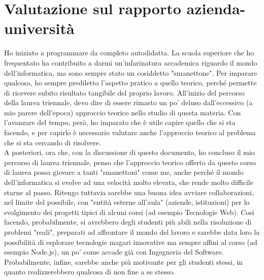 \section{Valutazione sul rapporto azienda-università}
Ho iniziato a programmare da completo autodidatta. La scuola superiore che ho frequentato ha contribuito a darmi un'infarinatura accademica riguardo il mondo dell'informatica, ma sono sempre stato un cosiddetto "smanettone". Per imparare qualcosa, ho sempre prediletto l'aspetto pratico a quello teorico, perché permette di ricevere subito risultato tangibile del proprio lavoro. All'inizio del percorso della laurea triennale, devo dire di essere rimasto un po' deluso dall'eccessivo (a mio parere dell'epoca) approccio teorico nello studio di questa materia. Con l'avanzare del tempo, però, ho imparato che è utile capire quello che si sta facendo, e per capirlo è necessario valutare anche l'approccio teorico al problema che si sta cercando di risolvere.\\
A posteriori, ora che, con la discussione di questo documento, ho concluso il mio percorso di laurea triennale, penso che l'approccio teorico offerto da questo corso di laurea possa giovare a tanti "smanettoni" come me, anche perché il mondo dell'informatica si evolve ad una velocità molto elevata, che rende molto difficile starne al passo. Ritengo tuttavia sarebbe una buona idea avviare collaborazioni, nel limite del possibile, con "entità esterne all'aula" (aziende, istituzioni) per lo svolgimento dei progetti tipici di alcuni corsi (ad esempio Tecnologie Web). Così facendo, probabilmente, si avrebbero degli studenti più abili nella risoluzione di problemi "reali", preparati ad affrontare il mondo del lavoro e sarebbe data loro la possibilità di esplorare tecnologie magari innovative ma sempre affini al corso (ad esempio Node.js), un po' come accade già con Ingegneria del Software. Probabilmente, infine, sarebbe anche più motivante per gli studenti stessi, in quanto realizzerebbero qualcosa di non fine a se stesso.